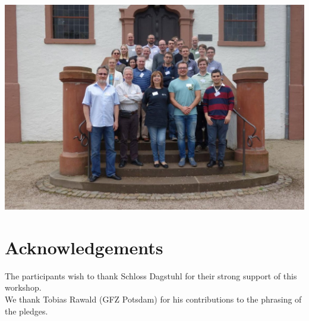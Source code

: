 \documentclass[a4paper,UKenglish]{dagman}
\begin{document}
\begin{center}
  \includegraphics[width=\textwidth]{picture-16252.jpg}
\end{center}

\section*{Acknowledgements}

The participants wish to thank Schloss Dagstuhl for their strong support of this workshop. \\
We thank Tobias Rawald (GFZ Potsdam) for his contributions to the phrasing of the pledges.


% 




\end{document}
